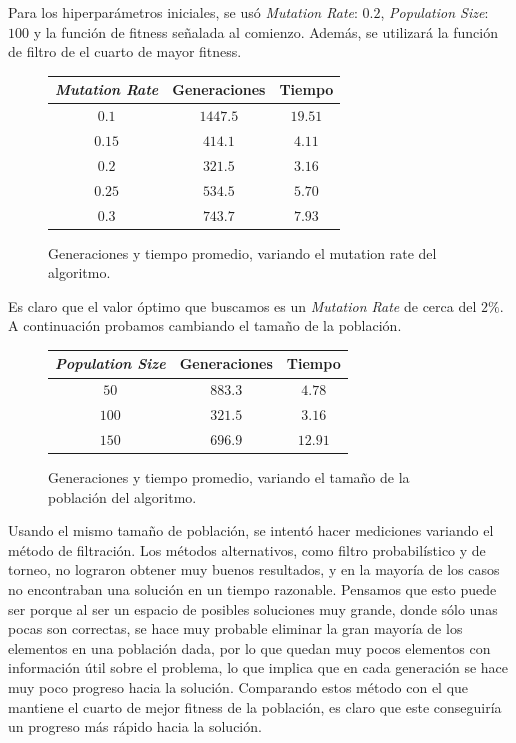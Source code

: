 \documentclass[letterpaper,11pt]{article} %
\begin{document}
  Para los hiperparámetros iniciales, se usó \textit{Mutation Rate}: $0.2$, \textit{Population Size}: $100$ y la función de fitness señalada al comienzo. Además, se utilizará la función de filtro de el cuarto de mayor fitness.

  \begin{figure}[H]
    \centering
    \begin{tabular}{|c|c|c|}
      \hline
      \textit{Mutation Rate} & Generaciones & Tiempo \\
      \hline
      $0.1$ & $1447.5$ & $19.51$ \\
      \hline
      $0.15$ & $414.1$ & $4.11$ \\
      \hline
      $0.2$ & $321.5$ & $3.16$ \\
      \hline
      $0.25$ & $534.5$ & $5.70$ \\
      \hline
      $0.3$ & $743.7$ & $7.93$ \\
      \hline
    \end{tabular}
    \caption{Generaciones y tiempo promedio, variando el mutation rate del algoritmo.}
  \end{figure}

  Es claro que el valor óptimo que buscamos es un \textit{Mutation Rate} de cerca del $2\%$. A continuación probamos cambiando el tamaño de la población.
  
  \begin{figure}[H]
    \centering
    \begin{tabular}{|c|c|c|}
      \hline
      \textit{Population Size} & Generaciones & Tiempo \\
      \hline
      $50$ & $883.3$ & $4.78$ \\
      \hline
      $100$ & $321.5$ & $3.16$ \\
      \hline
      $150$ & $696.9$ & $12.91$ \\
      \hline
    \end{tabular}
    \caption{Generaciones y tiempo promedio, variando el tamaño de la población del algoritmo.}
  \end{figure}

  Usando el mismo tamaño de población, se intentó hacer mediciones variando el método de filtración. Los métodos alternativos, como filtro probabilístico y de torneo, no lograron obtener muy buenos resultados, y en la mayoría de los casos no encontraban una solución en un tiempo razonable. Pensamos que esto puede ser porque al ser un espacio de posibles soluciones muy grande, donde sólo unas pocas son correctas, se hace muy probable eliminar la gran mayoría de los elementos en una población dada, por lo que quedan muy pocos elementos con información útil sobre el problema, lo que implica que en cada generación se hace muy poco progreso hacia la solución. Comparando estos método con el que mantiene el cuarto de mejor fitness de la población, es claro que este conseguiría un progreso más rápido hacia la solución. 
  
\end{document}
